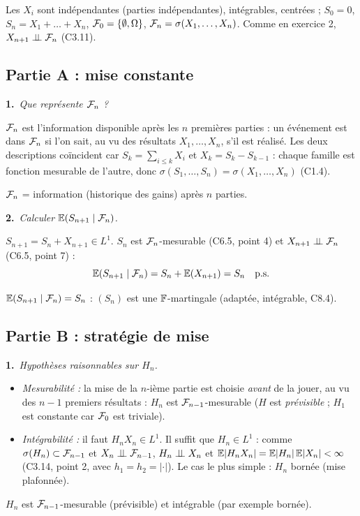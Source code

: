 \documentclass[11pt,a4paper]{article}
\newcommand{\question}[2]{\par\medskip\noindent\textbf{#1}~\textit{#2}\par\smallskip}
\begin{document}
\begin{exo}
Les $X_i$ sont indépendantes (parties indépendantes), intégrables, centrées ; $S_0=0$, $S_n=X_1+\dots+X_n$,
$\mathcal{F}_0=\{\emptyset,\Omega\}$, $\mathcal{F}_n=\sigma(X_1,\dots,X_n)$. Comme en exercice 2, $X_{n+1}\perp\!\!\!\perp\mathcal{F}_n$ (C3.11).

\subsection*{Partie A : mise constante}
\question{1.}{Que représente $\mathcal{F}_n$ ?}
$\mathcal{F}_n$ est l'information disponible après les $n$ premières parties : un événement est dans $\mathcal{F}_n$ si l'on sait, au vu des résultats
$X_1,\dots,X_n$, s'il est réalisé. Les deux descriptions coïncident car $S_k=\sum_{i\le k}X_i$ et $X_k=S_k-S_{k-1}$ : chaque famille est
fonction mesurable de l'autre, donc $\sigma(S_1,\dots,S_n)=\sigma(X_1,\dots,X_n)$ (C1.4).
\begin{resultat}$\mathcal{F}_n$ = information (historique des gains) après $n$ parties.\end{resultat}

\question{2.}{Calculer $\mathbb{E}(S_{n+1}\mid\mathcal{F}_n)$.}
$S_{n+1}=S_n+X_{n+1}\in L^1$. $S_n$ est $\mathcal{F}_n$-mesurable (C6.5, point 4) et $X_{n+1}\perp\!\!\!\perp\mathcal{F}_n$ (C6.5, point 7) :
\[\mathbb{E}(S_{n+1}\mid\mathcal{F}_n)=S_n+\mathbb{E}(X_{n+1})=S_n\quad\text{p.s.}\]
\begin{resultat}$\mathbb{E}(S_{n+1}\mid\mathcal{F}_n)=S_n$ : $(S_n)$ est une $\mathbb{F}$-martingale (adaptée, intégrable, C8.4).\end{resultat}

\subsection*{Partie B : stratégie de mise}
\question{1.}{Hypothèses raisonnables sur $H_n$.}
\begin{itemize}
  \item \emph{Mesurabilité :} la mise de la $n$-ième partie est choisie \emph{avant} de la jouer, au vu des $n-1$ premiers résultats :
  $H_n$ est $\mathcal{F}_{n-1}$-mesurable ($H$ est \emph{prévisible} ; $H_1$ est constante car $\mathcal{F}_0$ est triviale).
  \item \emph{Intégrabilité :} il faut $H_nX_n\in L^1$. Il suffit que $H_n\in L^1$ : comme $\sigma(H_n)\subset\mathcal{F}_{n-1}$ et
  $X_n\perp\!\!\!\perp\mathcal{F}_{n-1}$, $H_n\perp\!\!\!\perp X_n$ et $\mathbb{E}|H_nX_n|=\mathbb{E}|H_n|\,\mathbb{E}|X_n|<\infty$ (C3.14, point 2, avec $h_1=h_2=|\cdot|$). Le cas
  le plus simple : $H_n$ bornée (mise plafonnée).
\end{itemize}
\begin{resultat}$H_n$ est $\mathcal{F}_{n-1}$-mesurable (prévisible) et intégrable (par exemple bornée).\end{resultat}


\end{exo}
\end{document}
